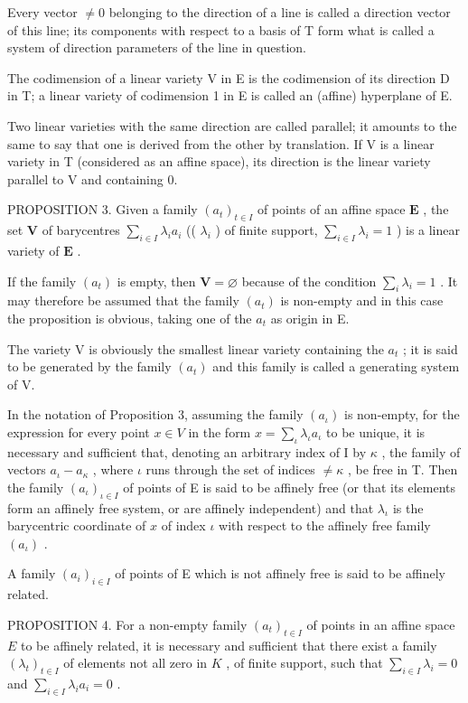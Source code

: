 Every vector \(\neq0\) belonging to the direction of a line is called a direction vector of this line; its components with respect to a basis of T form what is called a system of direction parameters of the line in question.

The codimension of a linear variety V in E is the codimension of its direction D in T; a linear variety of codimension 1 in E is called an (affine) hyperplane of E.

Two linear varieties with the same direction are called parallel; it amounts to the same to say that one is derived from the other by translation. If V is a linear variety in T (considered as an affine space), its direction is the linear variety parallel to V and containing 0.

PROPOSITION 3. Given a family \((a_{t})_{t\in I}\) of points of an affine space \(\mathbf{E}\) , the set \(\mathbf{V}\) of barycentres \(\sum_{i\in I}\lambda_i a_i\) (( \(\lambda_i\) ) of finite support, \(\sum_{i\in I}\lambda_i = 1\) ) is a linear variety of \(\mathbf{E}\) .

If the family \((a_{t})\) is empty, then \(\mathbf{V} = \varnothing\) because of the condition \(\sum_{i}\lambda_{i} = 1\) . It may therefore be assumed that the family \((a_{t})\) is non-empty and in this case the proposition is obvious, taking one of the \(a_{t}\) as origin in E.

The variety V is obviously the smallest linear variety containing the \(a_{t}\) ; it is said to be generated by the family \((a_{t})\) and this family is called a generating system of V.

In the notation of Proposition 3, assuming the family \((a_{\iota})\) is non-empty, for the expression for every point \(x \in V\) in the form \(x = \sum_{\iota} \lambda_{\iota} a_{\iota}\) to be unique, it is necessary and sufficient that, denoting an arbitrary index of I by \(\kappa\) , the family of vectors \(a_{\iota} - a_{\kappa}\) , where \(\iota\) runs through the set of indices \(\neq \kappa\) , be free in T. Then the family \((a_{\iota})_{\iota \in I}\) of points of E is said to be affinely free (or that its elements form an affinely free system, or are affinely independent) and that \(\lambda_{\iota}\) is the barycentric coordinate of \(x\) of index \(\iota\) with respect to the affinely free family \((a_{\iota})\) .

A family \((a_{i})_{i\in I}\) of points of E which is not affinely free is said to be affinely related.

PROPOSITION 4. For a non-empty family \((a_{t})_{t\in I}\) of points in an affine space \(E\) to be affinely related, it is necessary and sufficient that there exist a family \((\lambda_t)_{t\in I}\) of elements not all zero in \(K\) , of finite support, such that \(\sum_{i\in I}\lambda_i = 0\) and \(\sum_{i\in I}\lambda_i a_i = 0\) .

